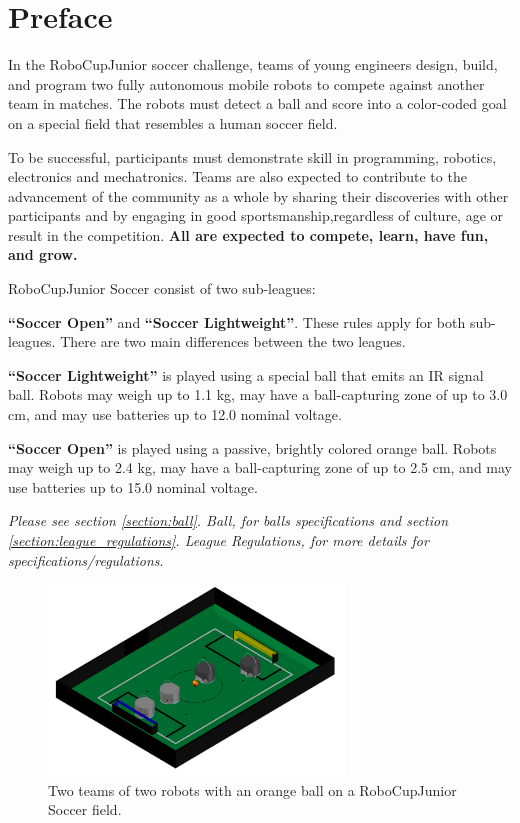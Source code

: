 \documentclass{article}
\begin{document}
\section*{Preface}

In the RoboCupJunior soccer challenge, teams of young engineers design, build,
and program two fully autonomous mobile robots to compete against another team
in matches. The robots must detect a ball and score into a color-coded goal on
a special field that resembles a human soccer field.

To be successful, participants must demonstrate skill in programming, robotics,
electronics and mechatronics.  Teams are also expected to contribute to the
advancement of the community as a whole by sharing their discoveries with other
participants and by engaging in good sportsmanship,regardless of culture, age or
result in the competition. \textbf{All are expected to compete,
learn, have fun, and grow.}

RoboCupJunior Soccer consist of two sub-leagues:

\textbf{``Soccer Open''} and \textbf{``Soccer Lightweight''}. These rules apply
for both sub-leagues. There are two main differences between the two leagues.

\textbf{``Soccer Lightweight''} is played using a special ball that emits an IR
signal ball. Robots may weigh up to 1.1 kg, may have a ball-capturing zone of
up to 3.0 cm, and may use batteries up to 12.0 nominal voltage.

\textbf{``Soccer Open''} is played using a passive, brightly colored orange
ball. Robots may weigh up to 2.4 kg, may have a ball-capturing zone of up to
2.5 cm, and may use batteries up to 15.0 nominal voltage.

\textit{Please see section \ref{section:ball}. Ball, for balls specifications and
    section \ref{section:league_regulations}. League Regulations, for more details for specifications/regulations}.

\begin{figure}[H]
    \centering
    \includegraphics[width=0.7\textwidth]{media/image1_new.jpeg}
    \caption{Two teams of two robots with an orange ball on a RoboCupJunior
        Soccer field.}
    \label{fig:name}
\end{figure}
\end{document}
